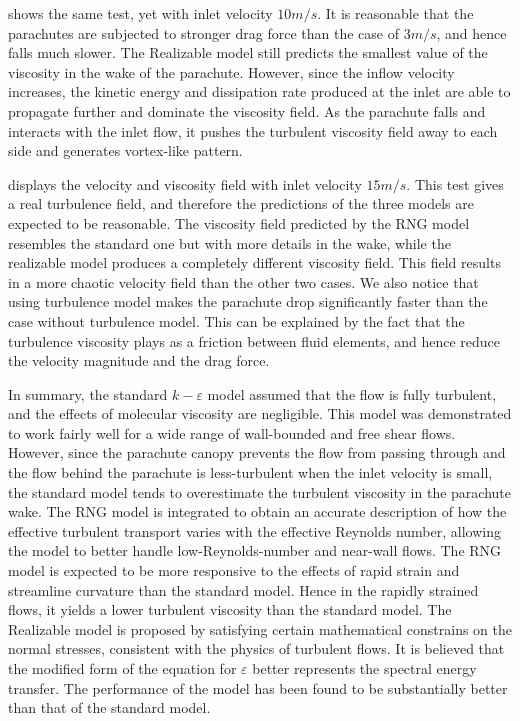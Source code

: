 shows the same test, yet with inlet velocity $10m/s$. It is reasonable that the parachutes are subjected to stronger drag force than the case of $3m/s$, and hence falls much slower. The Realizable model still predicts the smallest value of the viscosity in the wake of the parachute. However, since the inflow velocity increases, the kinetic energy and dissipation rate produced at the inlet are able to propagate further and dominate the viscosity field. As the parachute falls and interacts with the inlet flow, it pushes the turbulent viscosity field away to each side and generates vortex-like pattern.

 displays the velocity and viscosity field with inlet velocity $15m/s$. This test gives a real turbulence field, and therefore the predictions of the three models are expected to be reasonable. The viscosity field predicted by the RNG model resembles the standard one but with more details in the wake, while the realizable model produces a completely different viscosity field. This field results in a more chaotic velocity field than the other two cases. We also notice that using turbulence model makes the parachute drop significantly faster than the case without turbulence model. This can be explained by the fact that the turbulence viscosity plays as a friction between fluid elements, and hence reduce the velocity magnitude and the drag force.

In summary, the standard $k-\varepsilon$ model assumed that the flow is fully turbulent, and the effects of molecular viscosity are negligible. This model was demonstrated to work fairly well for a wide range of wall-bounded and free shear flows. However, since the parachute canopy prevents the flow from passing through and the flow behind the parachute is less-turbulent when the inlet velocity is small, the standard model tends to overestimate the turbulent viscosity in the parachute wake. The RNG model is integrated to obtain an accurate description of how the effective turbulent transport varies with the effective Reynolds number, allowing the model to better handle low-Reynolds-number and near-wall flows. The RNG model is expected to be more responsive to the effects of rapid strain and streamline curvature than the standard model. Hence in the rapidly strained flows, it yields a lower turbulent viscosity than the standard model. The Realizable model is proposed by satisfying certain mathematical constrains on the normal stresses, consistent with the physics of turbulent flows. It is believed that the modified form of the equation for $\varepsilon$ better represents the spectral energy transfer. The performance of the model has been found to be substantially better than that of the standard model.

